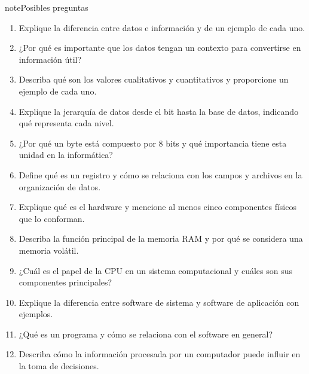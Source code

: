 \documentclass[letterpaper,10pt,spanish]{sphinxmanual}
\begin{document}
\begin{sphinxadmonition}{note}{Posibles preguntas}
\begin{enumerate}
%
\item {} 
\sphinxAtStartPar
Explique la diferencia entre datos e información y de un ejemplo de cada uno.

\item {} 
\sphinxAtStartPar
¿Por qué es importante que los datos tengan un contexto para convertirse en información útil?

\item {} 
\sphinxAtStartPar
Describa qué son los valores cualitativos y cuantitativos y proporcione un ejemplo de cada uno.

\item {} 
\sphinxAtStartPar
Explique la jerarquía de datos desde el bit hasta la base de datos, indicando qué representa cada nivel.

\item {} 
\sphinxAtStartPar
¿Por qué un byte está compuesto por 8 bits y qué importancia tiene esta unidad en la informática?

\item {} 
\sphinxAtStartPar
Define qué es un registro y cómo se relaciona con los campos y archivos en la organización de datos.

\item {} 
\sphinxAtStartPar
Explique qué es el hardware y mencione al menos cinco componentes físicos que lo conforman.

\item {} 
\sphinxAtStartPar
Describa la función principal de la memoria RAM y por qué se considera una memoria volátil.

\item {} 
\sphinxAtStartPar
¿Cuál es el papel de la CPU en un sistema computacional y cuáles son sus componentes principales?

\item {} 
\sphinxAtStartPar
Explique la diferencia entre software de sistema y software de aplicación con ejemplos.

\item {} 
\sphinxAtStartPar
¿Qué es un programa y cómo se relaciona con el software en general?

\item {} 
\sphinxAtStartPar
Describa cómo la información procesada por un computador puede influir en la toma de decisiones.


\end{enumerate}
\end{sphinxadmonition}
\end{document}
